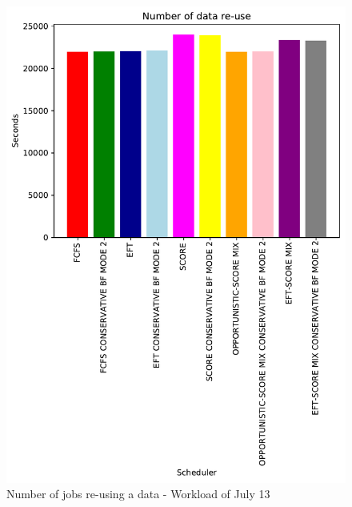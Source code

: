 \documentclass[conference,10pt]{IEEEtran}
\begin{document}
\begin{figure}\centering\includegraphics[width=1\linewidth]{../MBSS/plot/Results_FCFS_Score_Backfill_2022-07-13->2022-07-13_V10000_Number_of_data_reuse_450_128_32_256_4_1024.pdf}\caption{Number of jobs re-using a data - Workload of July 13}\end{figure}
\end{document}

